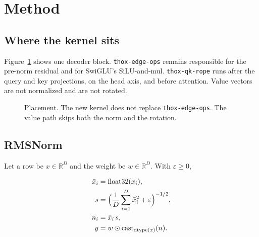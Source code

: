 \documentclass[11pt]{article}
\begin{document}
\section{Method}

\subsection{Where the kernel sits}

Figure~\ref{fig:place} shows one decoder block. \texttt{thox-edge-ops}
remains responsible for the pre-norm residual and for SwiGLU's
SiLU-and-mul. \texttt{thox-qk-rope} runs after the query and key
projections, on the head axis, and before attention. Value vectors are
not normalized and are not rotated.

\begin{figure}[t]
\centering
{}
\caption{Placement. The new kernel does not replace \texttt{thox-edge-ops}. The value path skips both the norm and the rotation.}
\label{fig:place}
\end{figure}

\subsection{RMSNorm}

Let a row be \(x \in \mathbb{R}^{D}\) and the weight be \(w \in \mathbb{R}^{D}\). With \(\varepsilon \ge 0\),

\begin{equation}
\begin{aligned}
\bar{x}_i &= \mathrm{float32}(x_i), \\
s &= \Bigl(\frac{1}{D}\sum_{i=1}^{D} \bar{x}_i^{2} + \varepsilon\Bigr)^{-1/2}, \\
n_i &= \bar{x}_i \, s, \\
y &= w \odot \mathrm{cast}_{\mathrm{dtype}(x)}(n).
\end{aligned}
\end{equation}
\end{document}
